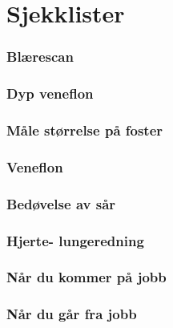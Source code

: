 \documentclass[a4paper,12pt,twoside]{memoir}
\begin{document}
		{}
		


	\part{Sjekklister}
		\section{Blærescan}
		\section{Dyp veneflon}
		\section{Måle størrelse på foster}
		\section{Veneflon}
		\section{Bedøvelse av sår}
		\section{Hjerte- lungeredning}
		\section{Når du kommer på jobb}
		\section{Når du går fra jobb}



		{}
		

\backmatter

 
          

	\listoffigures
	\listoftables
\end{document}
